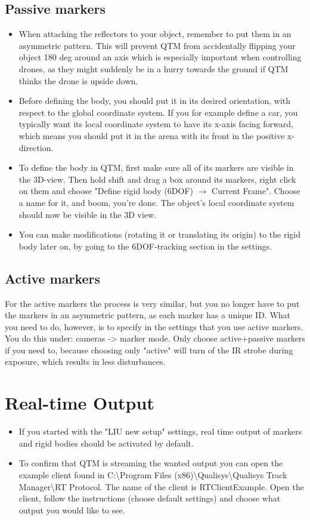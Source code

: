 \documentclass{article}
\begin{document}
\subsection{Passive markers}
\begin{itemize}
    \item When attaching the reflectors to your object, remember to put them in an asymmetric pattern. This will prevent QTM from accidentally flipping your object 180 deg around an axis which is especially important when controlling drones, as they might suddenly be in a hurry towards the ground if QTM thinks the drone is upside down.
    \item Before defining the body, you should put it in its desired orientation, with respect to the global coordinate system. If you for example define a car, you typically want its local coordinate system to have its x-axis facing forward, which means you should put it in the arena with its front in the positive x-direction.
    \item To define the body in QTM, first make sure all of its markers are visible in the 3D-view. Then hold shift and drag a box around its markers, right click on them and choose "Define rigid body (6DOF) $\rightarrow$ Current Frame". Choose a name for it, and boom, you're done. The object's local coordinate system should now be visible in the 3D view.
    \item You can make modifications (rotating it or translating its origin) to the rigid body later on, by going to the 6DOF-tracking section in the settings.
\end{itemize}
\subsection{Active markers}
    For the active markers the process is very similar, but you no longer have to put the markers in an asymmetric pattern, as each marker has a unique ID. What you need to do, however, is to specify in the settings that you use active markers. You do this under: cameras -> marker mode. Only choose active+passive markers if you need to, because choosing only "active" will turn of the IR strobe during exposure, which results in less disturbances.

\section{Real-time Output}
\begin{itemize}
    \item If you started with the "LIU new setup" settings, real time output of markers and rigid bodies should be activated by default.
    \item To confirm that QTM is streaming the wanted output you can open the example client found in C:\textbackslash Program Files (x86)\textbackslash Qualisys\textbackslash Qualisys Track Manager\textbackslash RT Protocol. The name of the client is RTClientExample. Open the client, follow the instructions (choose default settings) and choose what output you would like to see.
\end{itemize}
\end{document}
